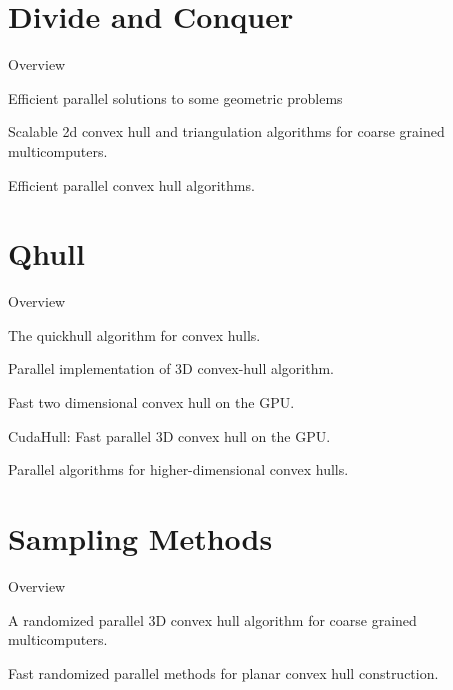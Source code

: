 \documentclass[11pt]{beamer}
\begin{document}
\section{Divide and Conquer}
\begin{frame}{Overview}
\end{frame}

\begin{frame}{Efficient parallel solutions to some geometric problems}
\end{frame}
\begin{frame}{Scalable 2d convex hull and triangulation algorithms for coarse grained multicomputers.}
\end{frame}
\begin{frame}{Efficient parallel convex hull algorithms.}
\end{frame}





\section{Qhull}

\begin{frame}{Overview}
\end{frame}

\begin{frame}{The quickhull algorithm for convex hulls.}
\end{frame}
\begin{frame}{Parallel implementation of 3D convex-hull algorithm.}
\end{frame}
\begin{frame}{Fast two dimensional convex hull on the GPU.}
\end{frame}
\begin{frame}{CudaHull: Fast parallel 3D convex hull on the GPU.}
\end{frame}
\begin{frame}{Parallel algorithms for higher-dimensional convex hulls.}
\end{frame}


\section{Sampling Methods}
\begin{frame}{Overview}
\end{frame}
\begin{frame}{A randomized parallel 3D convex hull algorithm for coarse grained multicomputers.}
\end{frame}
\begin{frame}{Fast randomized parallel methods for planar convex hull construction.}
\end{frame}
\end{document}
